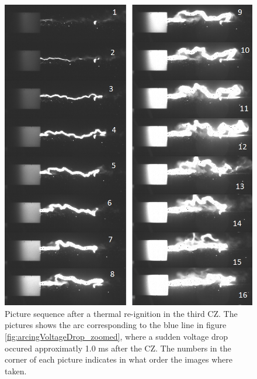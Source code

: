 \documentclass[10pt,b5paper,twoside]{article}
\begin{document}
\begin{figure}[H]
\centering
\includegraphics[scale=0.67, angle =0 ]{Bilder/Results/301_23_TR_TR_drop_2.png}
\caption{Picture sequence after a thermal re-ignition in the third CZ. The pictures shows the arc corresponding to the blue line in figure \ref{fig:arcingVoltageDrop_zoomed}, where a sudden voltage drop occured approximatly 1.0 ms after the CZ. The numbers in the corner of each picture indicates in what order the images where taken.} \label{fig:arcingVoltage_drop_301_blue_2}
\end{figure}

%
\end{document}
